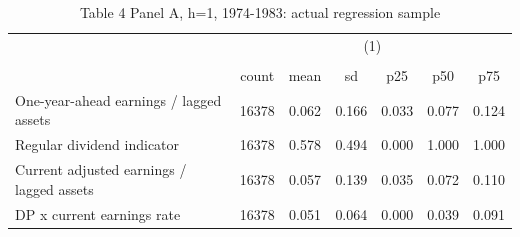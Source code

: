 \begin{table}[htbp]\centering
\def\sym#1{\ifmmode^{#1}\else\(^{#1}\)\fi}
\caption{Table 4 Panel A, h=1, 1974-1983: actual regression sample}
\begin{tabular}{l*{1}{cccccc}}
\hline\hline
                    &\multicolumn{6}{c}{(1)}                                                      \\
                    &\multicolumn{6}{c}{}                                                         \\
                    &       count&        mean&          sd&         p25&         p50&         p75\\
\hline
One-year-ahead earnings / lagged assets&       16378&       0.062&       0.166&       0.033&       0.077&       0.124\\
Regular dividend indicator&       16378&       0.578&       0.494&       0.000&       1.000&       1.000\\
Current adjusted earnings / lagged assets&       16378&       0.057&       0.139&       0.035&       0.072&       0.110\\
DP x current earnings rate&       16378&       0.051&       0.064&       0.000&       0.039&       0.091\\
\hline\hline
\end{tabular}
\end{table}
